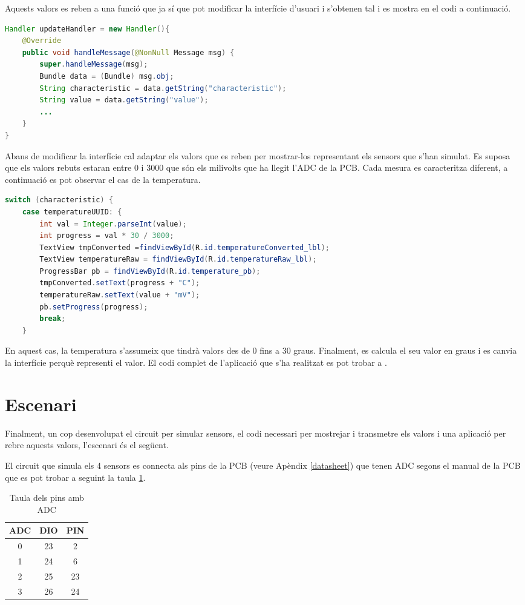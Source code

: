 Aquests valors es reben a una funció que ja sí que pot modificar la interfície d'usuari i s'obtenen tal i es mostra en el codi a continuació.

\begin{lstlisting}[language=java]
 Handler updateHandler = new Handler(){
	@Override
	public void handleMessage(@NonNull Message msg) {
		super.handleMessage(msg);
		Bundle data = (Bundle) msg.obj;
		String characteristic = data.getString("characteristic");
		String value = data.getString("value");
		...
	}
}
\end{lstlisting}

Abans de modificar la interfície cal adaptar els valors que es reben per mostrar-los representant els sensors que s'han simulat.
Es suposa que els valors rebuts estaran entre 0 i 3000 que són els milivolts que ha llegit l'ADC de la PCB.
Cada mesura es caracteritza diferent, a continuació es pot observar el cas de la temperatura.

\begin{lstlisting}[language=java]
 switch (characteristic) {
	case temperatureUUID: {
		int val = Integer.parseInt(value);
		int progress = val * 30 / 3000;
		TextView tmpConverted =findViewById(R.id.temperatureConverted_lbl);
		TextView temperatureRaw = findViewById(R.id.temperatureRaw_lbl);
		ProgressBar pb = findViewById(R.id.temperature_pb);
		tmpConverted.setText(progress + "C");
		temperatureRaw.setText(value + "mV");
		pb.setProgress(progress);
		break;
	}
\end{lstlisting}

En aquest cas, la temperatura s'assumeix que tindrà valors des de 0 fins a 30 graus.
Finalment, es calcula el seu valor en graus i es canvia la interfície perquè representi el valor.
El codi complet de l'aplicació que s'ha realitzat es pot trobar a \cite{android_repo}.

\newpage
\section{Escenari}
Finalment, un cop desenvolupat el circuit per simular sensors, el codi necessari per mostrejar i transmetre els valors i una aplicació per rebre aquests valors, l'escenari és el següent.

El circuit que simula els 4 sensors es connecta als pins de la PCB (veure Apèndix \ref{datasheet}) que tenen ADC segons el manual de la PCB que es pot trobar a \cite{manual_placa} seguint la taula \ref{connexions}.

\begin{table}[!h]
	\begin{center}
		\begin{tabular}{|c|c|c|}
			\hline
			ADC			&	DIO		& 	PIN		\\	\hline
			0			&	23		&	2		\\	\hline
			1			&	24		&	6		\\	\hline
			2			&	25		&	23		\\	\hline
			3			&	26		&	24		\\	\hline
		\end{tabular}
	\end{center}
	\caption{Taula dels pins amb ADC}
	\label{connexions}
\end{table}

